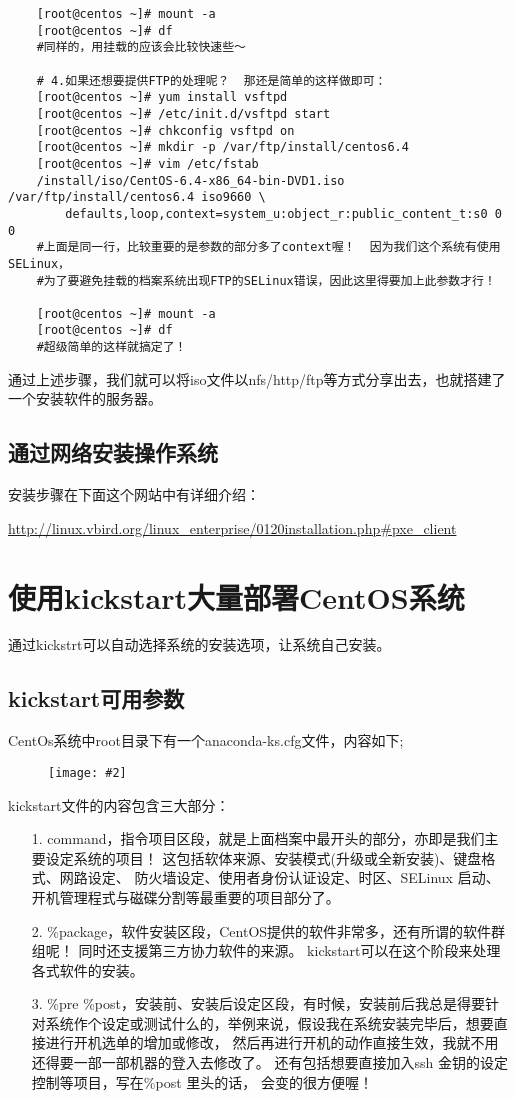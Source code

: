 \documentclass[a4paper,left=1.5cm,right=1.5cm,11pt]{article}
\newcommand{\sizedfic}[2]{\begin{figure}[H]
		\center
		\texttt{[image: \#2]}
	\end{figure}}
\begin{document}
\begin{lstlisting}
	[root@centos ~]# mount -a
	[root@centos ~]# df
	#同样的，用挂载的应该会比较快速些～

	# 4.如果还想要提供FTP的处理呢？  那还是简单的这样做即可：
	[root@centos ~]# yum install vsftpd
	[root@centos ~]# /etc/init.d/vsftpd start
	[root@centos ~]# chkconfig vsftpd on
	[root@centos ~]# mkdir -p /var/ftp/install/centos6.4
	[root@centos ~]# vim /etc/fstab
	/install/iso/CentOS-6.4-x86_64-bin-DVD1.iso /var/ftp/install/centos6.4 iso9660 \ 
		defaults,loop,context=system_u:object_r:public_content_t:s0 0 0
	#上面是同一行，比较重要的是参数的部分多了context喔！  因为我们这个系统有使用SELinux， 
	#为了要避免挂载的档案系统出现FTP的SELinux错误，因此这里得要加上此参数才行！

	[root@centos ~]# mount -a
	[root@centos ~]# df
	#超级简单的这样就搞定了！
	\end{lstlisting}

	通过上述步骤，我们就可以将iso文件以nfs/http/ftp等方式分享出去，也就搭建了一个安装软件的服务器。

\subsection{通过网络安装操作系统}
	安装步骤在下面这个网站中有详细介绍：\par
	\url{http://linux.vbird.org/linux_enterprise/0120installation.php#pxe_client}

\clearpage

\section{使用kickstart大量部署CentOS系统}
	通过kickstrt可以自动选择系统的安装选项，让系统自己安装。

\subsection{kickstart可用参数}
	CentOs系统中root目录下有一个anaconda-ks.cfg文件，内容如下;
	\sizedfic{0.9}{4.png}

	kickstart文件的内容包含三大部分：
	\begin{itemize}
		\item[1.] command，指令项目区段，就是上面档案中最开头的部分，亦即是我们主要设定系统的项目！ 这包括软体来源、安装模式(升级或全新安装)、键盘格式、网路设定、 防火墙设定、使用者身份认证设定、时区、SELinux 启动、开机管理程式与磁碟分割等最重要的项目部分了。 
		\item[2.] \%package，软件安装区段，CentOS提供的软件非常多，还有所谓的软件群组呢！ 同时还支援第三方协力软件的来源。 kickstart可以在这个阶段来处理各式软件的安装。 
		\item[3.] \%pre \%post，安装前、安装后设定区段，有时候，安装前后我总是得要针对系统作个设定或测试什么的，举例来说，假设我在系统安装完毕后，想要直接进行开机选单的增加或修改， 然后再进行开机的动作直接生效，我就不用还得要一部一部机器的登入去修改了。 还有包括想要直接加入ssh 金钥的设定控制等项目，写在\%post 里头的话， 会变的很方便喔！
	\end{itemize}
\end{document}
